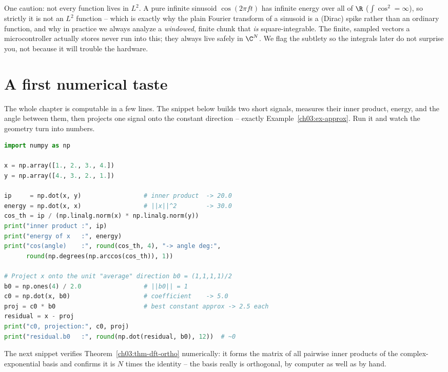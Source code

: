 \begin{formalbox}
One caution: not every function lives in $L^2$. A pure infinite sinusoid $\cos(2\pi f t)$
has infinite energy over all of $\R$ ($\int \cos^2 = \infty$), so strictly it is not an $L^2$
function -- which is exactly why the plain Fourier transform of a sinusoid is a (Dirac) spike rather
than an ordinary function, and why in practice we always analyze a \emph{windowed}, finite chunk that
\emph{is} square-integrable. The finite, sampled vectors a microcontroller actually stores never run
into this; they always live safely in $\C^N$. We flag the subtlety so the integrals later do not
surprise you, not because it will trouble the hardware.
\end{formalbox}

\section{A first numerical taste}
\label{ch03:numerics}

The whole chapter is computable in a few lines. The snippet below builds two short signals, measures
their inner product, energy, and the angle between them, then projects one signal onto the
constant direction -- exactly Example~\ref{ch03:ex-approx}. Run it and watch the geometry turn into
numbers.

\begin{lstlisting}[language=Python,caption={Signals as vectors: inner product, energy, angle, projection.},label={ch03:code-inner}]
import numpy as np

x = np.array([1., 2., 3., 4.])
y = np.array([4., 3., 2., 1.])

ip     = np.dot(x, y)                 # inner product  -> 20.0
energy = np.dot(x, x)                 # ||x||^2        -> 30.0
cos_th = ip / (np.linalg.norm(x) * np.linalg.norm(y))
print("inner product :", ip)
print("energy of x   :", energy)
print("cos(angle)    :", round(cos_th, 4), "-> angle deg:",
      round(np.degrees(np.arccos(cos_th)), 1))

# Project x onto the unit "average" direction b0 = (1,1,1,1)/2
b0 = np.ones(4) / 2.0                 # ||b0|| = 1
c0 = np.dot(x, b0)                    # coefficient    -> 5.0
proj = c0 * b0                        # best constant approx -> 2.5 each
residual = x - proj
print("c0, projection:", c0, proj)
print("residual.b0   :", round(np.dot(residual, b0), 12))  # ~0
\end{lstlisting}

The next snippet verifies Theorem~\ref{ch03:thm-dft-ortho} numerically: it forms the matrix of all
pairwise inner products of the complex-exponential basis and confirms it is $N$ times the identity --
the basis really is orthogonal, by computer as well as by hand.

